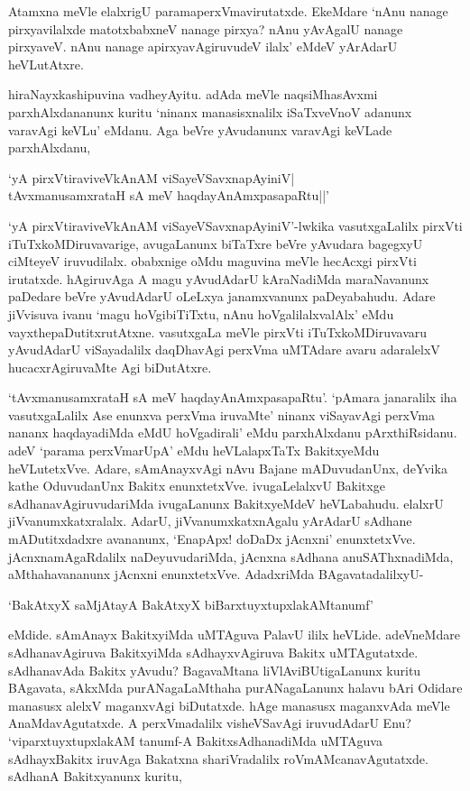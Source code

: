 Atamxna meVle elalxrigU paramaperxVmavirutatxde. EkeMdare `nAnu nanage pirxyavilalxde matotxbabxneV nanage pirxya? nAnu yAvAgalU 
nanage pirxyaveV. nAnu nanage apirxyavAgiruvudeV ilalx' eMdeV yArAdarU heVLutAtxre.

hiraNayxkashipuvina vadheyAyitu. adAda meVle naqsiMhasAvxmi parxhAlxdananunx kuritu `ninanx manasisxnalilx iSaTxveVnoV adanunx varavAgi 
keVLu' eMdanu. Aga beVre yAvudanunx varavAgi keVLade parxhAlxdanu,

\begin{shloka}
`yA pirxVtiraviveVkAnAM viSayeVSavxnapAyiniV|\\
tAvxmanusamxrataH sA meV haqdayAnAmx\s pasapaRtu||'
\end{shloka}

`yA pirxVtiraviveVkAnAM viSayeVSavxnapAyiniV'-lwkika vasutxgaLalilx pirxVti iTuTxkoMDiruvavarige, avugaLanunx biTaTxre beVre yAvudara bagegxyU ciMteyeV 
iruvudilalx. obabxnige oMdu maguvina meVle hecAcxgi pirxVti irutatxde. hAgiruvAga A magu yAvudAdarU kAraNadiMda maraNavanunx paDedare 
beVre yAvudAdarU oLeLxya janamxvanunx paDeyabahudu. Adare jiVvisuva ivanu `magu hoVgibiTiTxtu, nAnu hoVgalilalxvalAlx' eMdu vayxthepaDutitxrutAtxne. 
vasutxgaLa meVle pirxVti iTuTxkoMDiruvavaru yAvudAdarU viSayadalilx daqDhavAgi perxVma uMTAdare avaru adaralelxV hucacxrAgiruvaMte Agi biDutAtxre.

`tAvxmanusamxrataH sA meV haqdayAnAmx\s pasapaRtu'. `pAmara janaralilx iha vasutxgaLalilx Ase enunxva perxVma iruvaMte' ninanx viSayavAgi perxVma nananx 
haqdayadiMda eMdU hoVgadirali' eMdu parxhAlxdanu pArxthiRsidanu. adeV `parama perxVmarUpA' eMdu heVLalapxTaTx BakitxyeMdu heVLutetxVve. 
Adare, sAmAnayxvAgi nAvu Bajane mADuvudanUnx, deYvika kathe OduvudanUnx Bakitx enunxtetxVve. ivugaLelalxvU Bakitxge sAdhanavAgiruvudariMda 
ivugaLanunx BakitxyeMdeV heVLabahudu. elalxrU jiVvanumxkatxralalx. AdarU, jiVvanumxkatxnAgalu yArAdarU sAdhane mADutitxdadxre avananunx, `EnapApx! doDaDx 
jAcnxni' enunxtetxVve. jAcnxnamAgaRdalilx naDeyuvudariMda, jAcnxna sAdhana anuSAThxnadiMda, aMthahavananunx jAcnxni enunxtetxVve. AdadxriMda BAgavatadalilxyU-

\begin{shloka}
`BakAtxyX saMjAtayA BakAtxyX biBarxtuyxtupxlakAMtanumf'
\end{shloka}

\noindent eMdide. sAmAnayx BakitxyiMda uMTAguva PalavU ililx heVLide. adeVneMdare sAdhanavAgiruva BakitxyiMda sAdhayxvAgiruva Bakitx uMTAgutatxde. 
sAdhanavAda Bakitx yAvudu? BagavaMtana liVlAviBUtigaLanunx kuritu BAgavata, sAkxMda purANagaLaMthaha purANagaLanunx halavu bAri Odidare manasusx 
alelxV maganxvAgi biDutatxde. hAge manasusx maganxvAda meVle AnaMdavAgutatxde. A perxVmadalilx visheVSavAgi iruvudAdarU Enu? `viparxtuyxtupxlakAM 
tanumf-A BakitxsAdhanadiMda uMTAguva sAdhayxBakitx iruvAga Bakatxna shariVradalilx roVmAMcanavAgutatxde. sAdhanA Bakitxyanunx kuritu,

